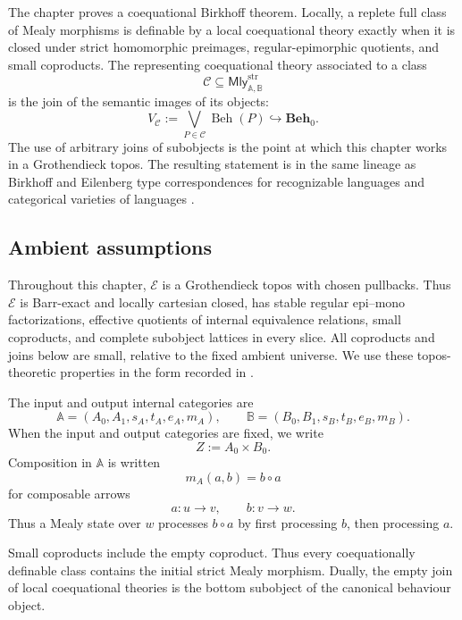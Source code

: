 The chapter proves a coequational Birkhoff theorem. Locally, a replete full
class of Mealy morphisms is definable by a local coequational theory exactly
when it is closed under strict homomorphic preimages, regular-epimorphic
quotients, and small coproducts. The representing coequational theory
associated to a class
\[
    \mathcal C\subseteq\mathsf{Mly}^{\mathrm{str}}_{\mathbb A,\mathbb B}
\]
is the join of the semantic images of its objects:
\[
    V_{\mathcal C}
    :=
    \bigvee_{P\in\mathcal C}\operatorname{Beh}(P)
    \hookrightarrow \mathbf{Beh}_0.
\]
The use of arbitrary joins of subobjects is the point at which this chapter
works in a Grothendieck topos. The resulting statement is in the same lineage
as Birkhoff and Eilenberg type correspondences for recognizable languages and
categorical varieties of languages
\cite{Eilenberg1974,AdamekMiliusMyersUrbat2019TOCL,Salamanca2016Monad,Salamanca2017Unveiling}.

\subsection{Ambient assumptions}
\label{subsec:coeq-birkhoff-ambient-assumptions}

\begin{assumption}
\label{ass:coeq-birkhoff-grothendieck-topos}
    Throughout this chapter, \(\mathcal E\) is a Grothendieck topos with chosen
    pullbacks. Thus \(\mathcal E\) is Barr-exact and locally cartesian closed,
    has stable regular epi--mono factorizations, effective quotients of
    internal equivalence relations, small coproducts, and complete subobject
    lattices in every slice. All coproducts and joins below are small, relative
    to the fixed ambient universe. We use these topos-theoretic properties in
    the form recorded in
    \cite{Johnstone2002,Borceux1994,Jacobs1999CategoricalLogic}.
\end{assumption}

The input and output internal categories are
\[
    \mathbb A=(A_0,A_1,s_A,t_A,e_A,m_A),
    \qquad
    \mathbb B=(B_0,B_1,s_B,t_B,e_B,m_B).
\]
When the input and output categories are fixed, we write
\[
    Z:=A_0\times B_0.
\]
Composition in \(\mathbb A\) is written
\[
    m_A(a,b)=b\circ a
\]
for composable arrows
\[
    a:u\to v,
    \qquad
    b:v\to w.
\]
Thus a Mealy state over \(w\) processes \(b\circ a\) by first processing \(b\),
then processing \(a\).

Small coproducts include the empty coproduct. Thus every coequationally
definable class contains the initial strict Mealy morphism. Dually, the empty
join of local coequational theories is the bottom subobject of the canonical
behaviour object.

